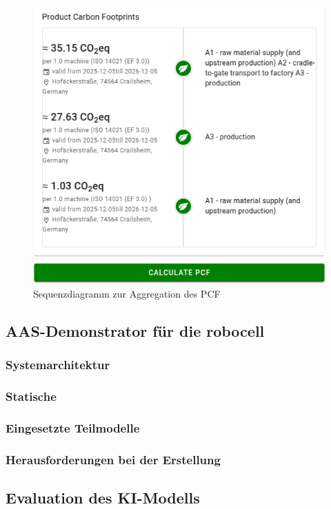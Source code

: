 \begin{figure}[htbp]
    \centering
        \includegraphics{Bilder/Ergebnisse/DPP/PluginAggregation.png}
    
    \caption{Sequenzdiagramm zur Aggregation des PCF}
    \label{fig:SequenzdiagrammPCF}
\end{figure}
\subsection{AAS-Demonstrator für die robocell}
\subsubsection{Systemarchitektur}
\subsubsection{Statische }
\subsubsection{Eingesetzte Teilmodelle}
\subsubsection{Herausforderungen bei der Erstellung}

\subsection{Evaluation des KI-Modells}
